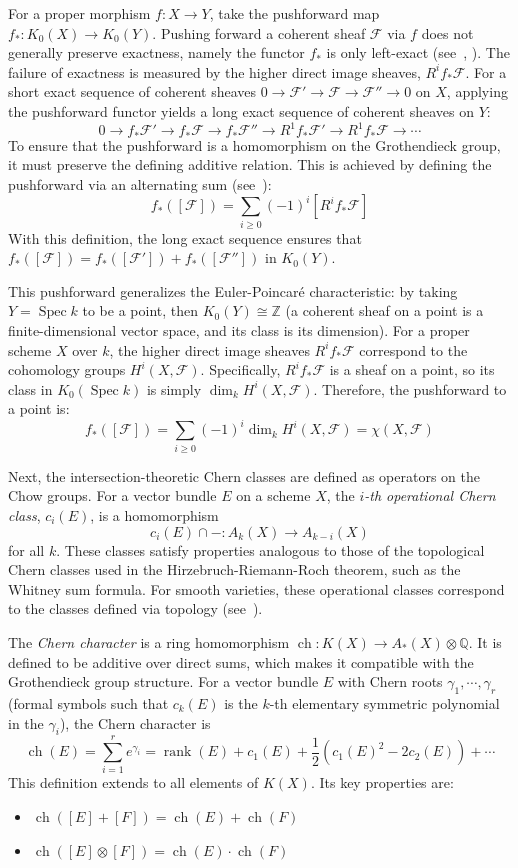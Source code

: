 \documentclass{book}
\newcommand{\Q}{{\mathbb{Q}}}
\newcommand{\Z}{{\mathbb{Z}}}
\newcommand{\CF}{{\mathcal{F}}}
\newcommand{\ch}{{\operatorname{ch}}}
\newcommand{\Spec}{{\operatorname{Spec}}}
\renewcommand{\ch}{{\operatorname{ch}}}
\begin{document}
For a proper morphism $f: X \to Y$, take the pushforward map $f_*: K_0(X) \to K_0(Y)$. Pushing forward a
coherent sheaf $\CF$ via $f$ does not generally preserve exactness, namely the functor $f_*$ is only left-exact (see~\cite{hartshorneAlgebraicGeometry2013}, \cite{NateAlgGeo}). The
failure of exactness is measured by the higher direct image sheaves, $R^i f_* \CF$. For a short exact sequence
of coherent sheaves $0 \to \CF' \to \CF \to \CF'' \to 0$ on $X$, applying the pushforward functor yields a
long exact sequence of coherent sheaves on $Y$:
\[
0 \to f_*\CF' \to f_*\CF \to f_*\CF'' \to R^1f_*\CF' \to R^1f_*\CF \to \cdots
\]
To ensure that the pushforward is a homomorphism on the Grothendieck group, it must preserve the defining
additive relation. This is achieved by defining the pushforward via an alternating sum
(see~\cite{hartshorneAlgebraicGeometry2013}):
\[
f_*([\CF]) = \sum_{i \ge 0} (-1)^i [R^i f_* \CF]
\]
With this definition, the long exact sequence ensures that $f_*([\CF]) = f_*([\CF']) + f_*([\CF''])$ in $K_0(Y)$.

This pushforward generalizes the Euler-Poincar\'e characteristic: by taking $Y = \Spec k$ to be a point, then
$K_0(Y) \cong \Z$ (a coherent sheaf on a point is a finite-dimensional vector space, and its class is its
dimension). For a proper scheme $X$ over $k$, the higher direct image sheaves $R^i f_* \CF$ correspond to the
cohomology groups $H^i(X, \CF)$. Specifically, $R^i f_* \CF$ is a sheaf on a point, so its class in $K_0(\Spec
k)$ is simply $\dim_k H^i(X, \CF)$. Therefore, the pushforward to a point is:
\[
f_*([\CF]) = \sum_{i \ge 0} (-1)^i \dim_k H^i(X, \CF) = \chi(X, \CF)
\]

Next, the intersection-theoretic Chern classes are defined as operators on the Chow groups. For a vector bundle $E$
on a scheme $X$, the \emph{$i$-th operational Chern class}, $c_i(E)$, is a homomorphism
\[
c_i(E) \cap - : A_k(X) \to A_{k-i}(X)
\]
for all $k$. These classes satisfy properties analogous to those of the topological Chern classes used in the
Hirzebruch-Riemann-Roch theorem, such as the Whitney sum formula. For smooth varieties, these operational
classes correspond to the classes defined via topology
(see~\cite{fultonIntersectionTheory1984}).

The \emph{Chern character} is a ring homomorphism $\ch: K(X) \to A_*(X) \otimes \Q$. It is defined to be
additive over direct sums, which makes it compatible with the Grothendieck group structure. For a vector
bundle $E$ with Chern roots $\gamma_1, \cdots, \gamma_r$ (formal symbols such that $c_k(E)$ is the $k$-th
elementary symmetric polynomial in the $\gamma_i$), the Chern character is
\[
\ch(E) = \sum_{i=1}^r e^{\gamma_i} = \operatorname{rank}(E) + c_1(E) + \frac{1}{2}(c_1(E)^2 - 2c_2(E)) + \cdots
\]
This definition extends to all elements of $K(X)$. Its key properties are:
\begin{itemize}
    \item $\ch([E] + [F]) = \ch(E) + \ch(F)$
    \item $\ch([E] \otimes [F]) = \ch(E) \cdot \ch(F)$
\end{itemize}
\end{document}
